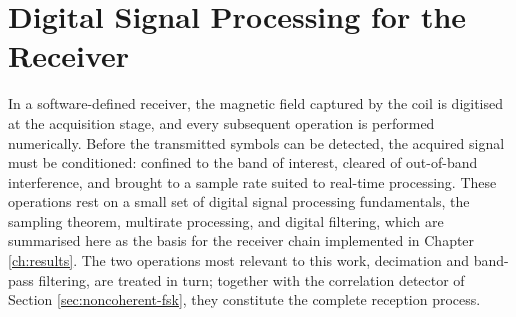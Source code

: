 






\section{Digital Signal Processing for the Receiver}
\label{sec:dsp}

In a software-defined receiver, the magnetic field captured by the coil is
digitised at the acquisition stage, and every subsequent operation is performed
numerically. Before the transmitted symbols can be detected, the acquired signal
must be conditioned: confined to the band of interest, cleared of out-of-band
interference, and brought to a sample rate suited to real-time processing. These
operations rest on a small set of digital signal processing fundamentals, the
sampling theorem, multirate processing, and digital filtering, which are
summarised here as the basis for the receiver chain implemented in
Chapter \ref{ch:results}. The two operations most relevant to this work,
decimation and band-pass filtering, are treated in turn; together with the
correlation detector of Section \ref{sec:noncoherent-fsk}, they constitute the
complete reception process.

